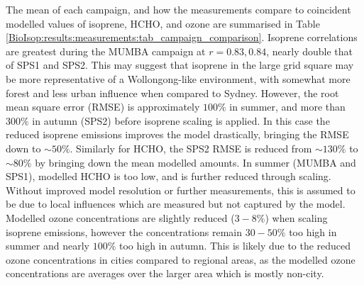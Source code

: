     The mean of each campaign, and how the measurements compare to coincident modelled values of isoprene, HCHO, and ozone are summarised in Table \ref{BioIsop:results:measurements:tab_campaign_comparison}.
    Isoprene correlations are greatest during the MUMBA campaign at $r=0.83,0.84$, nearly double that of SPS1 and SPS2.
    This may suggest that isoprene in the large grid square may be more representative of a Wollongong-like environment, with somewhat more forest and less urban influence when compared to Sydney.
    However, the root mean square error (RMSE) is approximately $100\%$ in summer, and more than $300\%$ in autumn (SPS2) before isoprene scaling is applied.
    In this case the reduced isoprene emissions improves the model drastically, bringing the RMSE down to $\sim{50}\%$.
    Similarly for HCHO, the SPS2 RMSE is reduced from $\sim{130}\%$ to $\sim{80}\%$ by bringing down the mean modelled amounts.
    In summer (MUMBA and SPS1), modelled HCHO is too low, and is further reduced through scaling.
    Without improved model resolution or further measurements, this is assumed to be due to local influences which are measured but not captured by the model.
    Modelled ozone concentrations are slightly reduced ($3-8\%$) when scaling isoprene emissions, however the concentrations remain $30-50\%$ too high in summer and nearly $100\%$ too high in autumn.
    This is likely due to the reduced ozone concentrations in cities compared to regional areas, as the modelled ozone concentrations are averages over the larger area which is mostly non-city.
    
